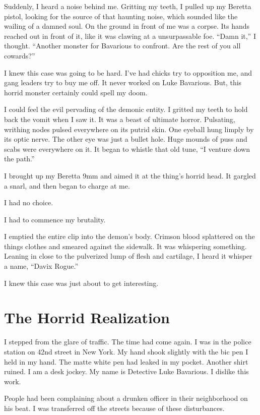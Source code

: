 Suddenly, I heard a noise behind me. Gritting my teeth, I pulled up my
Beretta pistol, looking for the source of that haunting noise, which
sounded like the wailing of a damned soul. On the ground in front of me
was a corpse. Its hands reached out in front of it, like it was clawing
at a unsurpassable foe. ``Damn it,'' I thought. ``Another monster for
Bavarious to confront. Are the rest of you all cowards?''

I knew this case was going to be hard. I've had chicks try to opposition
me, and gang leaders try to buy me off. It never worked on Luke
Bavarious. But, this horrid monster certainly could spell my doom.

I could feel the evil pervading of the demonic entity. I gritted my
teeth to hold back the vomit when I saw it. It was a beast of ultimate
horror. Pulsating, writhing nodes pulsed everywhere on its putrid
skin. One eyeball hung limply by its optic nerve. The other eye was just
a bullet hole. Huge mounds of puss and scabs were everywhere on it. It
began to whistle that old tune, ``I venture down the path.''

I brought up my Beretta 9mm and aimed it at the thing's horrid head. It
gargled a snarl, and then began to charge at me.

I had no choice.

I had to commence my brutality.

I emptied the entire clip into the demon's body. Crimson blood
splattered on the things clothes and smeared against the sidewalk. It
was whispering something. Leaning in close to the pulverized lump of
flesh and cartilage, I heard it whisper a name, ``Davix Rogue.''

I knew this case was just about to get interesting.


\chapter{The Horrid Realization}



I stepped from the glare of traffic. The time had come again. I was
in the police station on 42nd street in New York. My hand shook
slightly with the bic pen I held in my hand. The matte white pen
had leaked in my pocket. Another shirt ruined. I am a desk jockey.
My name is Detective Luke Bavarious. I dislike this work.

People had been complaining about a drunken officer in their
neighborhood on his beat. I was transferred off the streets because
of these disturbances.

